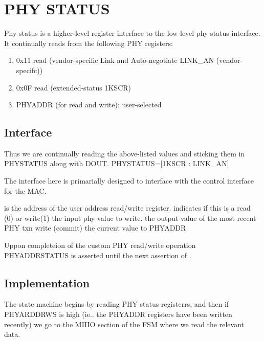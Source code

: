 \section{PHY STATUS}
Phy status is a higher-level register interface to the low-level phy status interface. It continually reads from the following PHY registers:
\begin{enumerate}
\item 0x11 read (vendor-specific Link and Auto-negotiate LINK_AN (vendor-specifc))
\item 0x0F read (extended-status 1KSCR)
\item PHYADDR (for read and write): user-selected
\end{enumerate}

\subsection{Interface}

Thus we are continually reading the above-listed values and sticking them in PHYSTATUS along with DOUT. PHYSTATUS=[1KSCR : LINK_AN]

The interface here is primarially designed to interface with the control interface for the MAC. 

 is the address of the user address read/write register. 
 indicates if this is a read (0) or write(1)
 the input phy value to write. 
 the output value of the most recent PHY txn
 write (commit) the current value to PHYADDR

Uppon completeion of the custom PHY read/write operation PHYADDRSTATUS is asserted until the next assertion of . 

\subsection{Implementation}

The state machine begins by reading PHY status registerrs, and then if PHYARDDRWS is high (ie.. the PHYADDR registers have been written recently) we go to the MIIIO section of the FSM where we read the relevant data.
